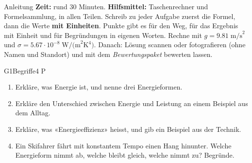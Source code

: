 \documentclass[11pt]{article}
\begin{document}

\begin{lpinfo}{Anleitung}
\textbf{Zeit:} rund 30 Minuten. \textbf{Hilfsmittel:} Taschenrechner und Formelsammlung, in allen Teilen.
Schreib zu jeder Aufgabe zuerst die Formel, dann die Werte \textbf{mit Einheiten}. Punkte gibt es für den Weg,
für das Ergebnis mit Einheit und für Begründungen in eigenen Worten. Rechne mit $g = 9.81\;\text{m/s}^2$ und $\sigma = 5.67 \cdot 10^{-8}\;\text{W/(m}^2\text{K}^4)$.
Danach: Lösung scannen oder fotografieren (ohne Namen und Standort) und mit dem \emph{Bewertungspaket} bewerten lassen.
\end{lpinfo}


\begin{lpaufgabe}{G1}{Begriffe}{4 P}
\begin{enumerate}[label=\alph*),leftmargin=*,itemsep=2pt,topsep=2pt]
\item Erkläre, was Energie ist, und nenne drei Energieformen.
\item Erkläre den Unterschied zwischen Energie und Leistung an einem Beispiel aus dem Alltag.
\item Erkläre, was «Energieeffizienz» heisst, und gib ein Beispiel aus der Technik.
\item Ein Skifahrer fährt mit konstantem Tempo einen Hang hinunter. Welche Energieform nimmt ab, welche bleibt gleich, welche nimmt zu? Begründe.
\end{enumerate}
\end{lpaufgabe}
\end{document}
